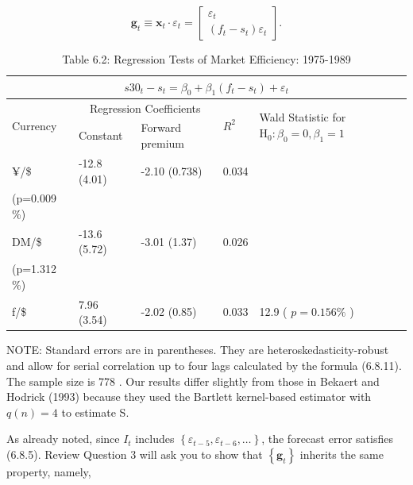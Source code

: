 \documentclass[10pt]{article}
\begin{document}
$$
\mathbf{g}_{t} \equiv \mathbf{x}_{t} \cdot \varepsilon_{t}=\left[\begin{array}{c}
\varepsilon_{t} \\
\left(f_{t}-s_{t}\right) \varepsilon_{t}
\end{array}\right] .
$$

\begin{table}[h]
\begin{center}
\captionsetup{labelformat=empty}
\caption{Table 6.2: Regression Tests of Market Efficiency: 1975-1989}
\begin{tabular}{|l|l|l|l|l|}
\hline
\multicolumn{5}{|c|}{$s 30_{t}-s_{t}=\beta_{0}+\beta_{1}\left(f_{t}-s_{t}\right)+\varepsilon_{t}$} \\
\hline
\multirow{2}{*}{Currency} & \multicolumn{2}{|c|}{Regression Coefficients} & \multirow{2}{*}{$R^{2}$} & \multirow{2}{*}{Wald Statistic for $\mathrm{H}_{0}: \beta_{0}=0, \beta_{1}=1$} \\
\hline
 & Constant & Forward premium &  &  \\
\hline
¥/\$ & -12.8 (4.01) & -2.10 (0.738) & 0.034 & \( \begin{gathered} 18.6 \\ (p=0.009 \%) \end{gathered} \) \\
\hline
DM/\$ & -13.6 (5.72) & -3.01 (1.37) & 0.026 & \( \left(\begin{array}{c} 8.7 \\ (p=1.312 \%) \end{array}\right. \) \\
\hline
f/\$ & 7.96 (3.54) & -2.02 (0.85) & 0.033 & 12.9 ( $p=0.156 \%$ ) \\
\hline
\end{tabular}
\end{center}
\end{table}

NOTE: Standard errors are in parentheses. They are heteroskedasticity-robust and allow for serial correlation up to four lags calculated by the formula (6.8.11). The sample size is 778 . Our results differ slightly from those in Bekaert and Hodrick (1993) because they used the Bartlett kernel-based estimator with $q(n)=4$ to estimate S.

As already noted, since $I_{t}$ includes $\left\{\varepsilon_{t-5}, \varepsilon_{t-6}, \ldots\right\}$, the forecast error satisfies (6.8.5). Review Question 3 will ask you to show that $\left\{\mathbf{g}_{t}\right\}$ inherits the same property, namely,
\end{document}
